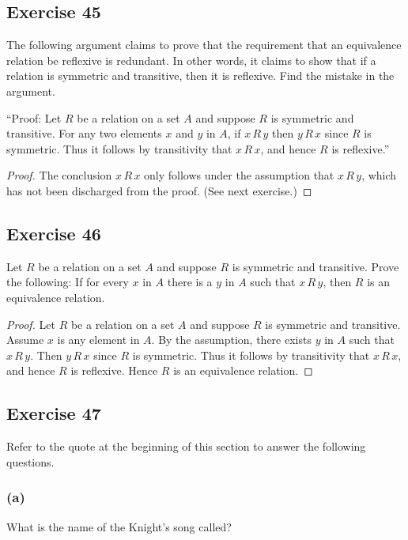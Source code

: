 \documentclass[14pt]{extarticle}
\begin{document}
\subsection{Exercise 45}
The following argument claims to prove that the requirement that an equivalence relation be reflexive is redundant. In
other words, it claims to show that if a relation is symmetric and transitive, then it is reflexive. Find the
mistake in the argument.

“Proof: Let $R$ be a relation on a set $A$ and suppose $R$ is symmetric and transitive. For any two elements $x$ and
$y$ in $A$, if \(x \,R\, y\) then \(y \,R\, x\) since $R$ is symmetric. Thus it follows by transitivity that
\(x \,R\, x\), and hence $R$ is reflexive.”

\begin{proof}
        The conclusion \(x \,R\, x\) only follows under the assumption that \(x \,R\, y\), which has not been
        discharged from the proof. (See next exercise.)
\end{proof}

\subsection{Exercise 46}
Let $R$ be a relation on a set $A$ and suppose $R$ is symmetric and transitive. Prove the following: If for every
$x$ in $A$ there is a $y$ in $A$ such that \(x \,R\, y\), then $R$ is an equivalence relation.

\begin{proof}
        Let $R$ be a relation on a set $A$ and suppose $R$ is symmetric and transitive. Assume $x$ is any element in $A$.
        By the assumption, there exists $y$ in $A$ such that \(x \,R\, y\). Then \(y \,R\, x\) since $R$ is symmetric. Thus
        it follows by transitivity that \(x \,R\, x\), and hence $R$ is reflexive. Hence $R$ is an equivalence relation.
\end{proof}

\subsection{Exercise 47}
Refer to the quote at the beginning of this section to answer the following questions.

\subsubsection{(a)}
What is the name of the Knight’s song called?
\end{document}
